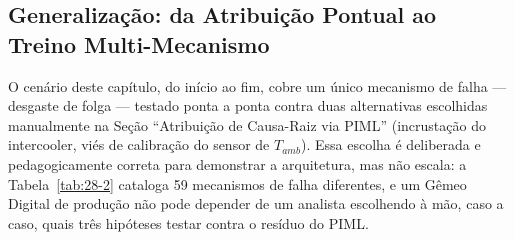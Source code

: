 \documentclass[12pt,a4paper]{article}
\numberwithin{equation}{section}
\numberwithin{table}{section}
\numberwithin{figure}{section}
\begin{document}
{\begin{table}[h!tbp]
	\centering
	\caption[Fluxo de dados do estudo de caso integrado]{Fluxo de dados do estudo de caso integrado — cada linha alimenta a próxima, do modelo físico à decisão prescritiva.}
	\label{tab:29-2}
\end{table}

\subsection{Generalização: da Atribuição Pontual ao Treino Multi-Mecanismo}

O cenário deste capítulo, do início ao fim, cobre um único mecanismo de falha — desgaste de folga — testado ponta a ponta contra duas alternativas escolhidas manualmente na Seção ``Atribuição de Causa-Raiz via PIML'' (incrustação do intercooler, viés de calibração do sensor de $T_{amb}$). Essa escolha é deliberada e pedagogicamente correta para demonstrar a arquitetura, mas não escala: a Tabela~\ref{tab:28-2} cataloga 59 mecanismos de falha diferentes, e um Gêmeo Digital de produção não pode depender de um analista escolhendo à mão, caso a caso, quais três hipóteses testar contra o resíduo do PIML.

}
\end{document}
